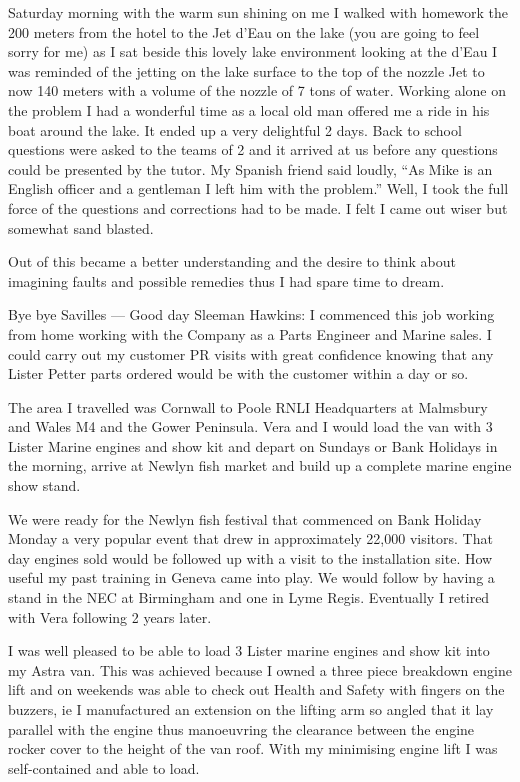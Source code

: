 Saturday morning with the warm sun shining on me I walked with homework the 200
meters from the hotel to the Jet d'Eau on the lake (you are going to feel sorry
for me) as I sat beside this lovely lake environment looking at the d'Eau I was
reminded of the jetting on the lake surface to the top of the nozzle Jet to now
140 meters with a volume of the nozzle of 7 tons of water.  Working alone on
the problem I had a wonderful time as a local old man offered me a ride in his
boat around the lake.  It ended up a very delightful 2 days.  Back to school
questions were asked to the teams of 2 and it arrived at us before any
questions could be presented by the tutor.  My Spanish friend said loudly, ``As
Mike is an English officer and a gentleman I left him with the problem.'' Well,
I took the full force of the questions and corrections had to be made.  I felt
I came out wiser but somewhat sand blasted.

Out of this became a better understanding and the desire to think about
imagining faults and possible remedies thus I had spare time to dream.

Bye bye Savilles --- Good day Sleeman Hawkins:  I commenced this job working
from home working with the Company as a Parts Engineer and Marine sales.  I
could carry out my customer PR visits with great confidence knowing that any
Lister Petter parts ordered would be with the customer within a day or so.

The area I travelled was Cornwall to Poole RNLI Headquarters at Malmsbury and
Wales M4 and the Gower Peninsula.  Vera and I would load the van with 3 Lister
Marine engines and show kit and depart on Sundays or Bank Holidays in the
morning, arrive at Newlyn fish market and build up a complete marine engine
show stand.

We were ready for the Newlyn fish festival that commenced on Bank Holiday Monday
a very popular event that drew in approximately 22,000 visitors.  That day
engines sold would be followed up with a visit to the installation site.  How
useful my past training in Geneva came into play.  We would follow by having a
stand in the NEC at Birmingham and one in Lyme Regis.  Eventually I retired
with Vera following 2 years later.

I was well pleased to be able to load 3 Lister marine engines and show kit into
my Astra van.  This was achieved because I owned a three piece breakdown engine
lift and on weekends was able to check out Health and Safety with fingers on
the buzzers, ie I manufactured an extension on the lifting arm so angled that
it lay parallel with the engine thus manoeuvring the clearance between the
engine rocker cover to the height of the van roof.  With my minimising engine
lift I was self-contained and able to load.

